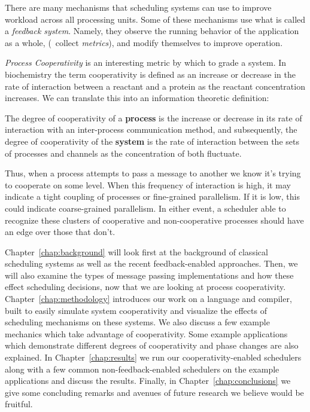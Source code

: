 There are many mechanisms that scheduling systems can use to improve workload 
across all processing units. Some of these 
mechanisms use what is called a {\em feedback system}. Namely, they observe the 
running behavior of the application as a whole, (\ie~collect {\em metrics}),
and modify themselves to improve operation. 

{\em Process Cooperativity} is an interesting metric by which to grade a system. In
biochemistry the term cooperativity is defined as an increase or decrease
in the rate of interaction between a reactant and a protein as the reactant
concentration increases. We can translate this into an information theoretic 
definition: 
\begin{newdef}\label{def:degree of cooperativity}
    The degree of cooperativity of a \textbf{process} is the increase or decrease 
    in its rate of interaction with an inter-process communication method, and
    subsequently, the degree of cooperativity of the \textbf{system} is the rate of
    interaction between the sets of processes and channels as the concentration
    of both fluctuate.
\end{newdef}

Thus, when a process attempts to pass a message to another we know it's trying 
to cooperate on some level. When this frequency of interaction is high, it may
indicate a tight coupling of processes or fine-grained parallelism. If it is 
low, this could indicate coarse-grained parallelism. In either event, a 
scheduler able to recognize these clusters of cooperative and non-cooperative 
processes should have an edge over those that don't.

Chapter~\ref{chap:background} will look first at the background of classical 
scheduling systems as well as the recent feedback-enabled approaches. Then, we 
will also examine the types of message passing implementations and how these
effect scheduling decisions, now that we are looking at process cooperativity.
Chapter~\ref{chap:methodology} introduces our work on a language and compiler,
built to easily simulate system cooperativity and visualize the effects of 
scheduling mechanisms on these systems. We also discuss a few example mechanics
which take advantage of cooperativity. Some example applications which 
demonstrate different degrees of cooperativity and phase changes are also 
explained.
In Chapter~\ref{chap:results} we run our cooperativity-enabled schedulers along
with a few common non-feedback-enabled schedulers on the example applications
and discuss the results. 
Finally, in Chapter~\ref{chap:conclusions} we give some concluding remarks and
avenues of future research we believe would be fruitful.

